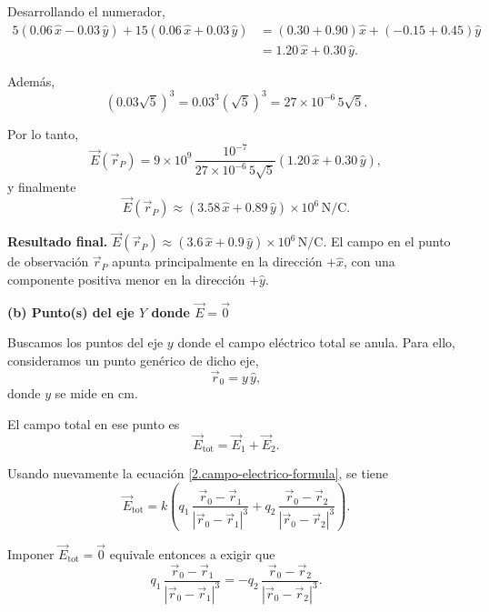 \documentclass[11pt]{article}
\newcommand{\resultadofinal}[1]{%
  \par\medskip
  \noindent\textbf{Resultado final.} #1\par
}
\begin{document}
Desarrollando el numerador,
\begin{align*}
5(0.06\,\hat x-0.03\,\hat y)
+
15(0.06\,\hat x+0.03\,\hat y)
&=
(0.30+0.90)\hat x+(-0.15+0.45)\hat y \\
&=
1.20\,\hat x+0.30\,\hat y.
\end{align*}

Además,
\begin{equation*}
(0.03\sqrt{5})^3
=
0.03^3(\sqrt{5})^3
=
27\times 10^{-6}\,5\sqrt{5}.
\end{equation*}

Por lo tanto,
\begin{equation*}
\vec E(\vec r_P)
=
9\times 10^9\,
\frac{10^{-7}}{27\times 10^{-6}\,5\sqrt{5}}
\left(1.20\,\hat x+0.30\,\hat y\right),
\end{equation*}
y finalmente
\begin{equation*}
\vec E(\vec r_P)
\approx
(3.58\,\hat x+0.89\,\hat y)\times 10^6\,\mathrm{N/C}.
\end{equation*}

\resultadofinal{$\boxed{\vec E(\vec r_P)\approx (3.6\,\hat x+0.9\,\hat y)\times 10^6\,\mathrm{N/C}.}$ El campo en el punto de observación $\vec r_P$ apunta principalmente en la dirección $+\hat x$, con una componente positiva menor en la dirección $+\hat y$.}

\newpage

\textbf{(b) Punto(s) del eje $Y$ donde $\vec E=\vec 0$}

Buscamos los puntos del eje $y$ donde el campo eléctrico total se anula. Para ello, consideramos un punto genérico de dicho eje,
\begin{equation*}
\vec r_0=y\,\hat y,
\end{equation*}
donde $y$ se mide en $\mathrm{cm}$.

El campo total en ese punto es
\begin{equation}\label{2.b.superposicion}
\vec E_{\mathrm{tot}}=\vec E_1+\vec E_2.
\end{equation}

Usando nuevamente la ecuación \eqref{2.campo-electrico-formula}, se tiene
\begin{equation*}
\vec E_{\mathrm{tot}}=
k\left(
q_1\,\frac{\vec r_0-\vec r_1}{|\vec r_0-\vec r_1|^3}
+
q_2\,\frac{\vec r_0-\vec r_2}{|\vec r_0-\vec r_2|^3}
\right).
\end{equation*}

Imponer $\vec E_{\mathrm{tot}}=\vec 0$ equivale entonces a exigir que
\begin{equation}\label{2.b.condicion-vectorial}
q_1\,\frac{\vec r_0-\vec r_1}{|\vec r_0-\vec r_1|^3}
=-q_2\,\frac{\vec r_0-\vec r_2}{|\vec r_0-\vec r_2|^3}.
\end{equation}
\end{document}
